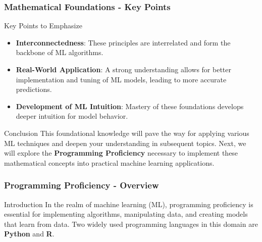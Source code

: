 \documentclass{beamer}
\begin{document}
\begin{frame}[fragile]
    \frametitle{Mathematical Foundations - Key Points}
    \begin{block}{Key Points to Emphasize}
        \begin{itemize}
            \item \textbf{Interconnectedness}: These principles are interrelated and form the backbone of ML algorithms.
            \item \textbf{Real-World Application}: A strong understanding allows for better implementation and tuning of ML models, leading to more accurate predictions.
            \item \textbf{Development of ML Intuition}: Mastery of these foundations develops deeper intuition for model behavior.
        \end{itemize}
    \end{block}
    
    \begin{block}{Conclusion}
        This foundational knowledge will pave the way for applying various ML techniques and deepen your understanding in subsequent topics. Next, we will explore the \textbf{Programming Proficiency} necessary to implement these mathematical concepts into practical machine learning applications.
    \end{block}
\end{frame}

\begin{frame}[fragile]
    \frametitle{Programming Proficiency - Overview}
    \begin{block}{Introduction}
        In the realm of machine learning (ML), programming proficiency is essential for implementing algorithms, manipulating data, and creating models that learn from data. 
        Two widely used programming languages in this domain are \textbf{Python} and \textbf{R}.
    \end{block}
\end{frame}
\end{document}
